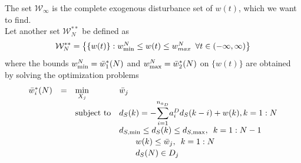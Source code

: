 \documentclass[letterpaper, 10 pt, conference]{ieeeconf}  %
\newcommand{\notimplies}{%
	\mathrel{{\ooalign{\hidewidth$\not\phantom{=}$\hidewidth\cr$\implies$}}}}
\newcommand{\SK}[1]{\textbf{\color{blue}{[SK: #1]}}}
\begin{document}
The set $\mathcal{W}_{\infty}$ is the complete exogenous disturbance set of $w(t)$, which we want to find.
	\\
Let another set $\mathcal{W}^{**}_{N}$ be defined as
\begin{equation}
		\hspace{0pt}
		\mathcal{W}^{**}_{N} = \begin{Bmatrix} \{w(t)\}: 
		w^{N}_{\rm min}\leq w(t)\leq w^{N}_{max} \hspace{5pt}
		\forall t \in (-\infty,\infty) 
		\end{Bmatrix}
    \label{eq:W**N}
\end{equation}  
where the bounds $w^{N}_{\rm min}=\bar w_1^*(N)$ and $w^{N}_{\rm max}=\bar w_2^*(N)$ on $\{w(t)\}$ are obtained by solving the optimization problems \SK{I feel that the problems should be such that for j=1 (for $d_S,min$), we maximize $\bar{w}_j$ with constraint $\bar{w}_j \leq w(k)$, and for j=2, (for $d_S,max$), we minimize $\bar{w}_j$ with constraint $w(k) \leq \bar{w}_j$. If this is the case, then according to lemma 1, the monotonically increasing and decreasing natures are shown.}
	\begin{equation}
	\small
	\label{bound_problem}
	\begin{array}{rcll}
	\bar w_i^*(N)&=&\underset{X_{j}}{\text{min}}& \bar{w}_j \\
	&&\text{subject to} &d_S(k) = -\mathlarger{\sum\limits_{i=1}^{n_{a_D}}}a_i^Dd_S(k-i) + w(k), k={1:N}\\[.2em]
	&&&d_{S,{\rm min}} \leq d_S(k) \leq d_{S,{\rm max}}, \hspace{5pt} k={1:N-1}\\[.2em]
	&&& \hspace{20pt}   w(k) \leq \bar{w}_j, \hspace{5pt} k={1:N}\\[.2em]
    &&& \hspace{20pt}  d_S(N) \in D_j 
	\end{array}
	\end{equation}
\end{document}
